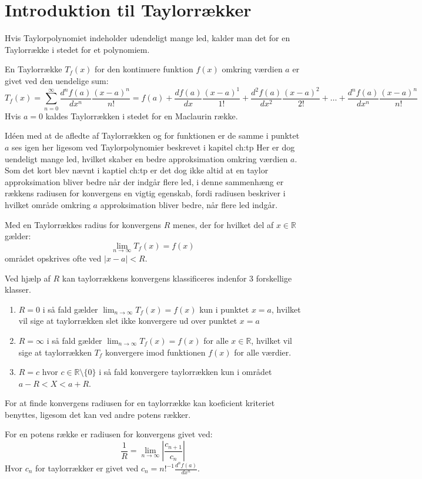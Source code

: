 \chapter{Introduktion til Taylorrækker}
\label{ch:tr}
Hvis Taylorpolynomiet indeholder udendeligt mange led, 
kalder man det for en Taylorrække i stedet for et polynomiem. 
\begin{defn}
    En Taylorrække $T_f(x)$ for den kontinuere funktion $f(x)$ omkring værdien $a$ er givet ved den uendelige sum:
    \[
        T_f(x) = \sum^{\infty}_{n=0} \frac{d^n f(a)}{dx^n} \frac{(x-a)^{n}}{n!} = f(a) + \frac{df(a)}{dx} \frac{(x-a)^{1}}{1!} + 
        \frac{d^{2}f(a)}{dx^{2}} \frac{(x-a)^{2}}{2!} + \ldots + \frac{d^{n} f(a)}{dx^{n}} \frac{(x-a)^n}{n!}
    \]
    Hvis $a = 0$ kaldes Taylorrækken i stedet for en Maclaurin række.
\end{defn}
\label{def:taylorrække}
Idéen med at de afledte af Taylorrækken og for funktionen er de samme i punktet $a$ 
ses igen her ligesom ved Taylorpolynomier beskrevet i kapitel \refname{ch:tp}
Her er dog uendeligt mange led, hvilket skaber en bedre approksimation omkring værdien $a$. 
Som det kort blev nævnt i kaptiel \refname{ch:tp} er det dog ikke altid at en taylor approksimation bliver bedre
når der indgår flere led, i denne sammenhæng er rækkens radiusen for konvergens en vigtig egenskab,
fordi radiusen beskriver i hvilket område omkring $a$ approksimation bliver bedre, når flere led indgår.
\begin{defn} %
    Med en Taylorrækkes radius for konvergens $R$ menes, der for hvilket del af $x \in \mathbb{R}$ gælder:
    \[
        \lim_{n \rightarrow \infty} T_f(x) = f(x)
    \]
    området opskrives ofte ved $|x-a| < R$.
\end{defn}
Ved hjælp af $R$ kan taylorrækkens konvergens klassificeres indenfor 3 forskellige klasser.
\begin{enumerate} %
    \item $R = 0$ i så fald gælder $\lim_{n \rightarrow \infty} T_f(x) = f(x)$ kun i punktet $x = a$,
    hvilket vil sige at taylorrækken slet ikke konvergere ud over punktet $x = a$
    \item $R = \infty$ i så fald gælder $\lim_{n \rightarrow \infty} T_f(x) = f(x)$ for alle $x \in \mathbb{R}$,
    hvilket vil sige at taylorrækken $T_f$ konvergere imod funktionen $f(x)$ for alle værdier.
    \item $R = c$ hvor $c \in \mathbb{R}\setminus\{0\}$ i så fald konvergere taylorrækken kun i området $a - R < X < a + R$.
\end{enumerate}
For at finde konvergens radiusen for en taylorrække kan koeficient kriteriet benyttes, ligesom det kan ved andre potens rækker.
\begin{defn} %
    For en potens række er radiusen for konvergens givet ved:
    \[
        \frac{1}{R} = \lim_{n \rightarrow \infty} \left\lvert \frac{c_{n + 1}}{c_n} \right\lvert
    \]
    Hvor $c_n$ for taylorrækker er givet ved $c_n = n!^{-1}\frac{d^n f(a)}{dx^n}$.
\end{defn} %


